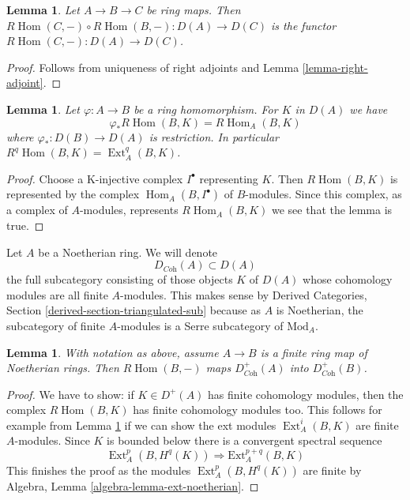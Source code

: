 \documentclass{stacks-project}
\theoremstyle{plain}
\newtheorem{lemma}[subsection]{Lemma}
\theoremstyle{definition}
\theoremstyle{remark}
\numberwithin{equation}{subsection}
\def\Hom{\mathop{\mathrm{Hom}}\nolimits}
\def\Ext{\mathop{\mathrm{Ext}}\nolimits}
\begin{document}
\begin{lemma}
\label{lemma-composition-right-adjoints}
Let $A \to B \to C$ be ring maps. Then
$R\Hom(C, -) \circ R\Hom(B, -) : D(A) \to D(C)$
is the functor $R\Hom(C, -) : D(A) \to D(C)$.
\end{lemma}

\begin{proof}
Follows from uniqueness of right adjoints and Lemma \ref{lemma-right-adjoint}.
\end{proof}

\begin{lemma}
\label{lemma-RHom-ext}
Let $\varphi : A \to B$ be a ring homomorphism. For $K$ in $D(A)$ we have
$$
\varphi_*R\Hom(B, K) = R\Hom_A(B, K)
$$
where $\varphi_* : D(B) \to D(A)$ is restriction. In particular
$R^q\Hom(B, K) = \Ext_A^q(B, K)$.
\end{lemma}

\begin{proof}
Choose a K-injective complex $I^\bullet$ representing $K$.
Then $R\Hom(B, K)$ is represented by the complex $\Hom_A(B, I^\bullet)$
of $B$-modules. Since this complex, as a complex of $A$-modules,
represents $R\Hom_A(B, K)$ we see that the lemma is true.
\end{proof}

\noindent
Let $A$ be a Noetherian ring. We will denote
$$
D_{\textit{Coh}}(A) \subset D(A)
$$
the full subcategory consisting of those objects $K$ of $D(A)$
whose cohomology modules are all finite $A$-modules. This makes sense
by Derived Categories, Section \ref{derived-section-triangulated-sub}
because as $A$ is Noetherian, the subcategory of finite $A$-modules
is a Serre subcategory of $\text{Mod}_A$.

\begin{lemma}
\label{lemma-exact-support-coherent}
With notation as above, assume $A \to B$ is a finite ring map of
Noetherian rings. Then $R\Hom(B, -)$ maps
$D^+_{\textit{Coh}}(A)$ into $D^+_{\textit{Coh}}(B)$.
\end{lemma}

\begin{proof}
We have to show: if $K \in D^+(A)$ has finite cohomology modules, then the
complex $R\Hom(B, K)$ has finite cohomology modules too.
This follows for example from Lemma \ref{lemma-RHom-ext}
if we can show the ext modules $\Ext^i_A(B, K)$
are finite $A$-modules. Since $K$ is bounded below there is a
convergent spectral sequence
$$
\Ext^p_A(B, H^q(K)) \Rightarrow \text{Ext}^{p + q}_A(B, K)
$$
This finishes the proof as the modules $\Ext^p_A(B, H^q(K))$
are finite by
Algebra, Lemma \ref{algebra-lemma-ext-noetherian}.
\end{proof}
\end{document}
